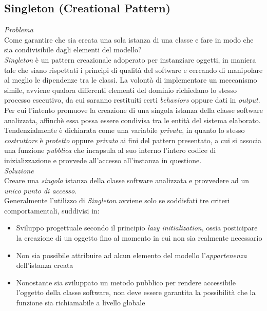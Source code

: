 \documentclass{article}
\begin{document}
\subsection*{Singleton (Creational Pattern)}
\large 
\textit{Problema}\\
Come garantire che sia creata una sola istanza di una classe e fare in modo che sia condivisibile dagli elementi del modello?\vspace*{14pt}\\
\textit{Singleton} è un pattern creazionale adoperato per instanziare oggetti, in maniera tale che siano rispettati i principi di qualità del software e cercando di manipolare al meglio le dipendenze tra le classi. La volontà di implementare un meccanismo simile, avviene qualora differenti elementi del dominio richiedano lo stesso processo esecutivo, da cui saranno restituiti certi \textit{behaviors} oppure dati in \textit{output}.\vspace*{14pt}\\
Per cui l'intento promuove la creazione di una singola istanza della classe software analizzata, affinchè essa possa essere condivisa tra le entità del sistema elaborato. Tendenzialmente è dichiarata come una variabile \textit{privata}, in quanto lo stesso \textit{costruttore} è \textit{protetto} oppure \textit{privato} ai fini del pattern presentato, a cui si associa una funzione \textit{pubblica} che incapsula al suo interno l'intero codice di inizializzazione e provvede all'accesso all'instanza in questione.\vspace*{14pt}\\
\textit{Soluzione}\\
Creare una \textit{singola} istanza della classe software analizzata e provvedere ad un \textit{unico punto di accesso}.\vspace*{14pt}\\
Generalmente l'utilizzo di \textit{Singleton} avviene solo se soddisfati tre criteri comportamentali, suddivisi in:
\begin{itemize}[label={-}]
    \itemsep0em
    \item Sviluppo progettuale secondo il principio \textit{lazy initialization}, ossia posticipare la creazione di un oggetto fino al momento in cui non sia realmente necessario 
    \item Non sia possibile attribuire ad alcun elemento del modello l'\textit{appartenenza} dell'istanza creata
    \item Nonostante sia sviluppato un metodo pubblico per rendere accessibile l'oggetto della classe software, non deve essere garantita la possibilità che la funzione sia richiamabile a livello globale
\end{itemize}
\end{document}
